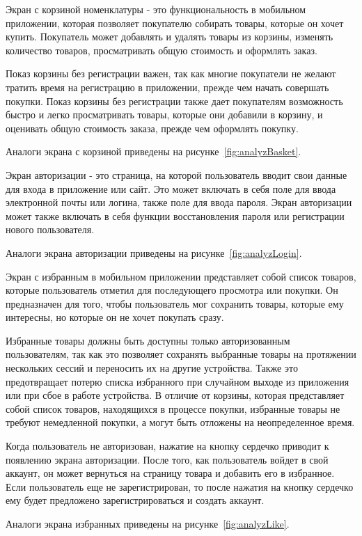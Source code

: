 Экран с корзиной номенклатуры - это функциональность в мобильном приложении,
которая позволяет покупателю собирать товары, которые он хочет купить.
Покупатель может добавлять и удалять товары из корзины, изменять количество товаров,
просматривать общую стоимость и оформлять заказ.

Показ корзины без регистрации важен,
так как многие покупатели не желают тратить время на регистрацию в приложении,
прежде чем начать совершать покупки.
Показ корзины без регистрации также дает покупателям возможность быстро и легко просматривать товары,
которые они добавили в корзину, и оценивать общую стоимость заказа, прежде чем оформлять покупку.

Аналоги экрана с корзиной приведены на рисунке~\ref{fig:analyzBasket}.

Экран авторизации - это страница, на которой пользователь вводит свои данные для входа
в приложение или сайт.
Это может включать в себя поле для ввода электронной почты или логина, 
 также поле для ввода пароля.
Экран авторизации может также включать в себя функции восстановления пароля
или регистрации нового пользователя. 

Аналоги экрана авторизации приведены на рисунке~\ref{fig:analyzLogin}.

Экран с избранным в мобильном приложении представляет собой список товаров,
которые пользователь отметил для последующего просмотра или покупки.
Он предназначен для того, чтобы пользователь мог сохранить товары, которые ему интересны,
но которые он не хочет покупать сразу.

Избранные товары должны быть доступны только авторизованным пользователям,
так как это позволяет сохранять выбранные товары на протяжении нескольких сессий
и переносить их на другие устройства.
Также это предотвращает потерю списка избранного при случайном выходе из приложения
или при сбое в работе устройства.
В отличие от корзины, которая представляет собой список товаров, находящихся в процессе покупки,
избранные товары не требуют немедленной покупки,
а могут быть отложены на неопределенное время.

Когда пользователь не авторизован, нажатие на кнопку сердечко приводит к появлению экрана авторизации.
После того, как пользователь войдет в свой аккаунт,
он может вернуться на страницу товара и добавить его в избранное.
Если пользователь еще не зарегистрирован,
то после нажатия на кнопку сердечко ему будет предложено зарегистрироваться и создать аккаунт.

Аналоги экрана избранных приведены на рисунке~\ref{fig:analyzLike}.

